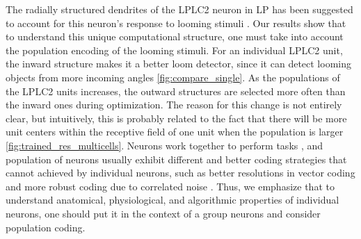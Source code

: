 \documentclass[pdftex,9pt,lineno]{elife}
\begin{document}








The radially structured dendrites of the LPLC2 neuron in LP has been suggested to account for this neuron's response to looming stimuli \citep{klapoetke2017ultra}. Our results show that to understand this unique computational structure, one must take into account the population encoding of the looming stimuli. For an individual LPLC2 unit, the inward structure makes it a better loom detector, since it can detect looming objects from more incoming angles \ref{fig:compare_single}. As the populations of the LPLC2 units increases, the outward structures are selected more often than the inward ones during optimization. The reason for this change is not entirely clear, but intuitively, this is probably related to the fact that there will be more unit centers within the receptive field of one unit when the population is larger \ref{fig:trained_res_multicells}. Neurons work together to perform tasks \citep{pasupathy2002population}, and population of neurons usually exhibit different and better coding strategies that cannot achieved by individual neurons, such as better resolutions in vector coding \citep{georgopoulos1986neuronal,vogels1990population} and more robust coding due to correlated noise \citep{franke2016structures,zylberberg2016direction,cafaro2020global}. Thus, we emphasize that to understand anatomical, physiological, and algorithmic properties of individual neurons, one should put it in the context of a group neurons and consider population coding.
\end{document}

